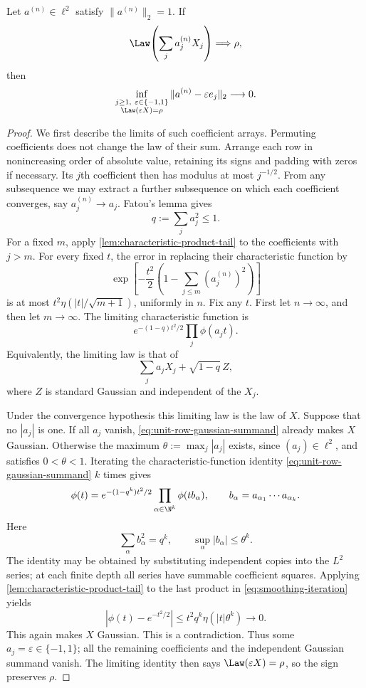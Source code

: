 \begin{lemma}
\label{lem:unit-row-rigidity}
Let $a^{(n)}\in\ell^2$ satisfy $\|a^{(n)}\|_2=1$.  If
\[
 \Law\!\left(\sum_j a_j^{(n)}X_j\right)
       \Longrightarrow\rho,
\]
then
\begin{equation}
 \inf_{\substack{j\geq1,\ \varepsilon\in\{-1,1\}\\
                  \Law(\varepsilon X)=\rho}}
       \|a^{(n)}-\varepsilon e_j\|_2\longrightarrow0.
 \label{eq:unit-row-qualitative}
\end{equation}
\end{lemma}
\begin{proof}
We first describe the limits of such coefficient arrays.  Permuting
coefficients does not change the law of their sum.  Arrange each row in
nonincreasing order of absolute value, retaining its signs and padding
with zeros if necessary.  Its $j$th coefficient then has modulus at most
$j^{-1/2}$.  From any subsequence we may extract a further subsequence
on which each coefficient converges, say $a_j^{(n)}\to a_j$.
Fatou's lemma gives
\[
 q:=\sum_j a_j^2\leq1.
\]
For a fixed $m$, apply
\cref{lem:characteristic-product-tail} to the coefficients with
$j>m$.  For every fixed $t$, the error in replacing their characteristic
function by
\[
 \exp\!\left[-\frac{t^2}{2}
        \left(1-\sum_{j\leq m}(a_j^{(n)})^2\right)\right]
\]
is at most
$t^2\eta(|t|/\sqrt{m+1})$, uniformly in $n$.
Fix any $t$.
First let $n\to\infty$, and then let $m\to\infty$.
The limiting characteristic function is
\begin{equation}
 e^{-(1-q)t^2/2}\prod_j\phi(a_jt).
 \label{eq:unit-row-gaussian-summand}
\end{equation}
Equivalently, the limiting law is that of
\[
 \sum_j a_jX_j+\sqrt{1-q}\,Z,
\]
where $Z$ is standard Gaussian and independent of the $X_j$.

Under the convergence hypothesis this limiting law is the law of $X$.
Suppose that no $|a_j|$ is one.  If all $a_j$ vanish,
\eqref{eq:unit-row-gaussian-summand} already makes $X$ Gaussian.
Otherwise the maximum
$\theta:=\max_j|a_j|$ exists, since $(a_j)\in\ell^2$, and satisfies
$0<\theta<1$.  Iterating the characteristic-function identity
\eqref{eq:unit-row-gaussian-summand} $k$ times gives
\begin{equation}
 \phi(t)=e^{-(1-q^k)t^2/2}
       \prod_{\alpha\in\N^k}\phi(tb_\alpha),
 \qquad
 b_\alpha=a_{\alpha_1}\cdots a_{\alpha_k}.
 \label{eq:smoothing-iteration}
\end{equation}
Here
\[
 \sum_\alpha b_\alpha^2=q^k,
 \qquad \sup_\alpha|b_\alpha|\leq\theta^k.
\]
The identity may be obtained by substituting independent copies into
the $L^2$ series; at each finite depth all series have summable
coefficient squares.  Applying
\cref{lem:characteristic-product-tail} to the last product in
\eqref{eq:smoothing-iteration} yields
\[
 |\phi(t)-e^{-t^2/2}|
 \leq t^2q^k\eta(|t|\theta^k)\longrightarrow0.
\]
This again makes $X$ Gaussian.
This is a contradiction.
Thus some
$a_j=\varepsilon\in\{-1,1\}$; all the remaining coefficients and
the independent Gaussian summand vanish.  The limiting identity then says
$\Law(\varepsilon X)=\rho$, so the sign preserves $\rho$.


\end{proof}
